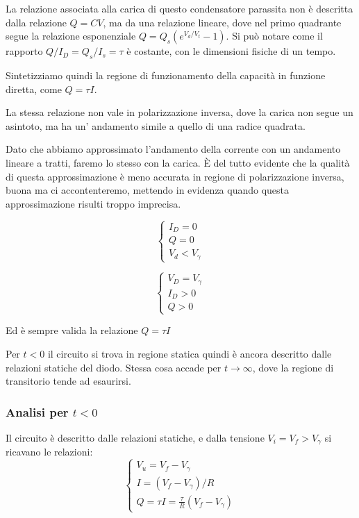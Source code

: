 \documentclass[../elettronica]{subfiles}
\begin{document}
La relazione associata alla carica di questo condensatore parassita non è descritta dalla relazione $Q=CV$, ma da una
relazione lineare, dove nel primo quadrante segue la relazione esponenziale $Q = Q_s (e^{V_d / V_t} - 1)$.
Si può notare come il rapporto $Q/I_D = Q_s / I_s = \tau$ è costante, con le dimensioni fisiche di un tempo.

Sintetizziamo quindi la regione di funzionamento della capacità in funzione diretta, come $Q=\tau I$.

La stessa relazione non vale in polarizzazione inversa, dove la carica non segue un asintoto, ma ha un' andamento
simile a quello di una radice quadrata.

Dato che abbiamo approssimato l'andamento della corrente con un andamento lineare a tratti, faremo lo stesso con la carica.
È del tutto evidente che la qualità di questa approssimazione è meno accurata in regione di polarizzazione inversa,
buona ma ci accontenteremo, mettendo in evidenza quando questa approssimazione risulti troppo imprecisa.

\begin{minipage}{.45\textwidth}
    \begin{tcolorbox}[title=Diodo OFF]
        \[\begin{cases}
            I_D = 0\\
            Q = 0\\
            V_d < V_\gamma
        \end{cases}\]
    \end{tcolorbox}
\end{minipage}
\begin{minipage}{.45\textwidth}
    \begin{tcolorbox}[title=Diodo ON]
        \[\begin{cases}
            V_D = V_\gamma\\
            I_D > 0\\
            Q > 0
        \end{cases}\]
    \end{tcolorbox}
\end{minipage}

Ed è sempre valida la relazione $Q = \tau I$

Per $t < 0$ il circuito si trova in regione statica quindi è ancora descritto dalle relazioni statiche del diodo.
Stessa cosa accade per $t \to \infty$, dove la regione di transitorio tende ad esaurirsi.
\subsubsection{Analisi per $t < 0$}
Il circuito è descritto dalle relazioni statiche, e dalla tensione $V_i = V_f > V_\gamma$ si ricavano le relazioni:
\[\begin{cases}
    V_u = V_{f} - V_\gamma
    \\
    I = (V_{f} - V_\gamma)/R
    \\
    Q = \tau I = \frac{\tau}{R} (V_{f} - V_\gamma)
\end{cases}\]
\end{document}
